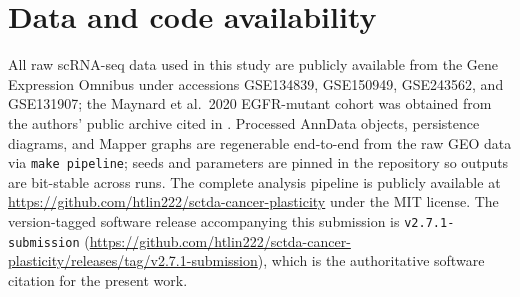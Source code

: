 \documentclass[Numbered, sn-mathphys-num]{sn-jnl}
\begin{document}
\section*{Data and code availability}
All raw scRNA-seq data used in this study are publicly available from
the Gene Expression Omnibus under accessions GSE134839, GSE150949,
GSE243562, and GSE131907; the Maynard et al.~2020 EGFR-mutant cohort was
obtained from the authors' public archive cited in \citet{maynard2020}.
Processed AnnData objects, persistence diagrams, and Mapper graphs are
regenerable end-to-end from the raw GEO data via \texttt{make pipeline};
seeds and parameters are pinned in the repository so outputs are
bit-stable across runs. The complete analysis pipeline is publicly
available at \url{https://github.com/htlin222/sctda-cancer-plasticity}
under the MIT license. The version-tagged software release accompanying
this submission is \texttt{v2.7.1-submission}
(\url{https://github.com/htlin222/sctda-cancer-plasticity/releases/tag/v2.7.1-submission}),
which is the authoritative software citation for the present work.

\clearpage

\end{document}
